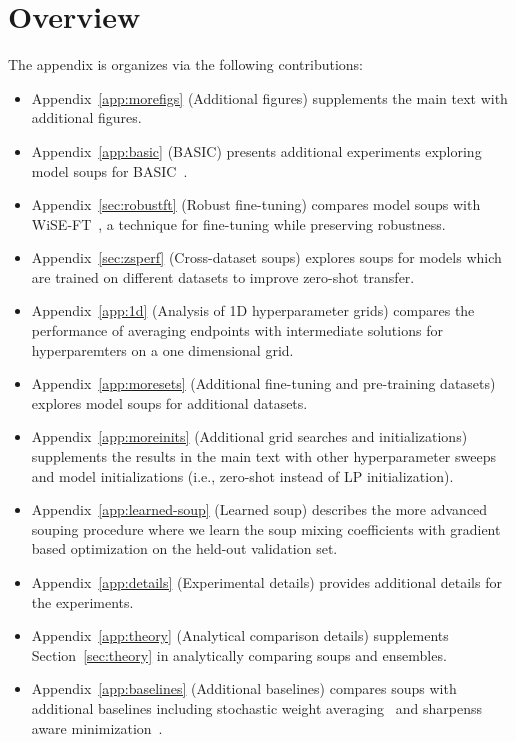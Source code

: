 \documentclass[nohyperref]{article}
\theoremstyle{plain}
\theoremstyle{definition}
\theoremstyle{remark}
\begin{document}
    \section{Overview}
    The appendix is organizes via the following contributions:
    \begin{itemize}
        \item Appendix~\ref{app:morefigs} (Additional figures) supplements the main text with additional figures.
        \item Appendix~\ref{app:basic} (BASIC) presents additional experiments exploring model soups for BASIC~\cite{pham2021scaling}.
        \item Appendix~\ref{sec:robustft} (Robust fine-tuning) compares model soups with WiSE-FT~\cite{wortsman2021robust}, a technique for fine-tuning while preserving robustness.
        \item Appendix~\ref{sec:zsperf} (Cross-dataset soups) explores soups for models which are trained on different datasets to improve zero-shot transfer.
        \item Appendix~\ref{app:1d} (Analysis of 1D hyperparameter grids) compares the performance of averaging endpoints with intermediate solutions for hyperparemters on a one dimensional grid.
        \item Appendix~\ref{app:moresets} (Additional fine-tuning and pre-training datasets) explores model soups for additional datasets.
        \item Appendix~\ref{app:moreinits} (Additional grid searches and initializations) supplements the results in the main text with other hyperparameter sweeps and model initializations (i.e., zero-shot instead of LP initialization).
        \item Appendix~\ref{app:learned-soup} (Learned soup) describes the more advanced souping procedure where we learn the soup mixing coefficients with gradient based optimization on the held-out validation set.
        \item Appendix~\ref{app:details} (Experimental details) provides additional details for the experiments.
        \item Appendix~\ref{app:theory} (Analytical comparison details) supplements Section~\ref{sec:theory} in analytically comparing soups and ensembles.
        \item Appendix~\ref{app:baselines} (Additional baselines) compares soups with additional baselines including stochastic weight averaging~\cite{izmailov2018averaging} and sharpenss aware minimization~\cite{foret2021sharpnessaware}.
    \end{itemize}
    
\end{document}
